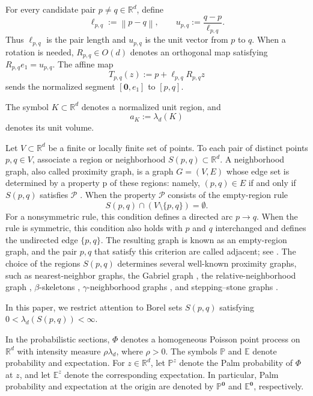 \documentclass[a4paper,fleqn]{cas-dc}
\numberwithin{equation}{section}
\newcommand{\R}{\mathds{R}}
\newcommand{\Pp}{\mathds{P}}
\newcommand{\E}{\mathds{E}}
\newcommand{\1}{\mathds{1}}
\newcommand{\norm}[1]{\left\lVert #1\right\rVert}
\newcommand{\ellpq}{\ell_{p,q}}
\newcommand{\upq}{u_{p,q}}
\newcommand{\0}{\mathbf{0}}
\begin{document}
For every candidate pair \(p\neq q\in \R^d\), define
\begin{equation}\label{eq:ell-direction}
        \ellpq:=\norm{p-q},
        \qquad
        \upq:=\frac{q-p}{\ellpq}.
\end{equation}
Thus \(\ellpq\) is the pair length and \(\upq\) is the unit vector 
from \(p\) to \(q\).  When a rotation is needed, \(R_{p,q}\in O(d)\) denotes
an orthogonal map satisfying
\(
        R_{p,q}e_1=\upq .
\)
The affine map 
\begin{equation}
        T_{p,q}(z):=p+\ellpq R_{p,q}z
\end{equation}
 sends the normalized segment \([\0,e_1]\) to \([p,q]\).  

The symbol \(K\subset\R^d\) denotes a normalized unit region, and
\begin{equation}
    a_K:=\lambda_d(K)
\end{equation}
denotes its unit volume. 

Let \(V\subset \R^d\) be a finite or locally finite set of points. To each pair of distinct points $p,q\in V$, associate a region or neighborhood $S(p,q)\subset \R^d$. A neighborhood graph, also called proximity graph, is a graph  $G=(V,E)$ whose edge set is determined by a property $\mathrm{p}$ of these regions: namely, $(p,q)\in E$ if and only if $S(p,q)$ satisfies $\mathcal{P}$ \citep{jaromczyk1992relative}. When the property $\mathcal{P}$ consists of the empty-region rule
\begin{equation}
    S(p,q)\cap (V\setminus\{p,q\})=\emptyset.
\end{equation}
For a nonsymmetric rule, this condition defines a directed arc
\(p\to q\). When the rule is symmetric, this condition also holds with
\(p\) and \(q\) interchanged and defines the undirected edge
\(\{p,q\}\).
The resulting graph is known as an empty-region graph, and the pair \(p, q\) that satisfy this criterion are called adjacent; see \citet{cardinal2009empty}. The choice of the regions $S(p,q)$ determines several well-known proximity graphs, such as nearest-neighbor graphs, the Gabriel graph \citep{gabriel1969statistical}, the relative-neighborhood graph \citep{toussaint1980relative}, $\beta$-skeletons \citep{kirkpatrick1985framework}, $\gamma$-neighborhood graphs \citep{veltkamp1992gamma}, and stepping--stone graphs \citep{kannangara2018stepping}.

In this paper, we restrict attention to  Borel sets \(S(p,q)\) satisfying  \(0<\lambda_d(S(p,q))<\infty  \). 

In the probabilistic sections, \(\Phi\) denotes a homogeneous Poisson point
process on \(\R^d\) with intensity measure \(\rho\lambda_d\), where
\(\rho>0\).  The symbols \(\Pp\) and \(\E\) denote probability and expectation. For \(z\in\R^d\), let \(\Pp^z\) denote the Palm probability of \(\Phi\) at \(z\), and let \(\E^z\) denote the corresponding expectation. In particular, Palm probability and expectation at the origin are denoted by \(\Pp^{\0}\) and
\(\E^{\0}\), respectively.
\end{document}
